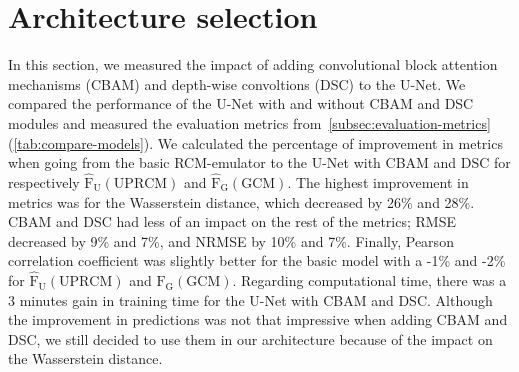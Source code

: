 \documentclass[a4paper,11pt,oneside]{report}
\begin{document}
\section{Architecture selection}
In this section, we measured the impact of adding convolutional block attention mechanisms (CBAM) and depth-wise convoltions (DSC) to the U-Net. We compared the performance of the U-Net with and without CBAM and DSC modules and measured the evaluation metrics from~\autoref{subsec:evaluation-metrics} (\autoref{tab:compare-models}). We calculated the percentage of improvement in metrics when going from the basic RCM-emulator to the U-Net with CBAM and DSC for respectively $\mathrm{\hat{F}_{U}(UPRCM)}$ and $\mathrm{\hat{F}_{G}(GCM)}$. The highest improvement in metrics was for the Wasserstein distance, which decreased by 26\% and 28\%. CBAM and DSC had less of an impact on the rest of the metrics; RMSE decreased by 9\% and 7\%, and NRMSE by 10\% and 7\%. Finally, Pearson correlation coefficient was slightly better for the basic model with a -1\% and -2\% for $\mathrm{\hat{F}_{U}(UPRCM)}$ and $\mathrm{\hat{F}_{G}(GCM)}$. Regarding computational time, there was a 3 minutes gain in training time for the U-Net with CBAM and DSC. Although the improvement in predictions was not that impressive when adding CBAM and DSC, we still decided to use them in our architecture because of the impact on the Wasserstein distance. 

\newpage
\begin{landscape}

\end{landscape}
\end{document}
